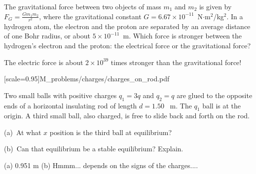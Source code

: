 \begin{Exercise}
The gravitational force between two objects of mass $m_1$ and $m_2$ is given by $\displaystyle F_G=\frac{Gm_1 m_2}{r^2}$, where the gravitational constant $G=6.67 \times 10^{-11}$~N$\cdot$m$^2$/kg$^2$.  In a hydrogen atom, the electron and the proton are separated by an average distance of one Bohr radius, or about $5 \times 10^{-11}$~m.  
Which force is stronger between the hydrogen's electron and the proton: the electrical force or the gravitational force?    
\end{Exercise}
\begin{Answer}
The electric force is about $2 \times 10^{39}$ times stronger than the gravitational force!
\end{Answer}

[scale=0.95]{M_problems/charges/charges_on_rod.pdf}{
\begin{Exercise}
Two small balls with positive charges $q_1=3q$ and $q_2=q$ are glued to the opposite ends of a horizontal insulating rod of length $d=1.50$~ m.  
The $q_1$ ball is at the origin.  
A third small ball, also charged, is free to slide back and forth on the rod.  

(a)~At what $x$ position is the third ball at equilibrium?
  
(b)~Can that equilibrium be a stable equilibrium? Explain.

\end{Exercise}
}\begin{Answer}
(a) 0.951 m (b) Hmmm... depends on the signs of the charges....
\end{Answer}

